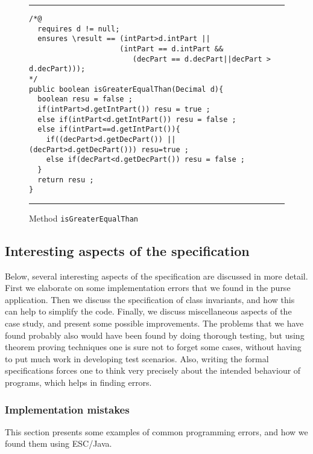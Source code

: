 \documentclass[a4paper]{llncs}
\begin{document}
\begin{figure}[t]
\rule{\linewidth}{0.3mm}
\begin{verbatim}
/*@
  requires d != null;
  ensures \result == (intPart>d.intPart ||
                     (intPart == d.intPart && 
                        (decPart == d.decPart||decPart > d.decPart)));
*/
public boolean isGreaterEqualThan(Decimal d){
  boolean resu = false ;
  if(intPart>d.getIntPart()) resu = true ;
  else if(intPart<d.getIntPart()) resu = false ;
  else if(intPart==d.getIntPart()){
    if((decPart>d.getDecPart()) || (decPart>d.getDecPart())) resu=true ;
    else if(decPart<d.getDecPart()) resu = false ;
  }
  return resu ;
}
\end{verbatim}
\caption{Method {\tt isGreaterEqualThan}}
\label{fig-cla-dec}
\rule{\linewidth}{0.3mm}
\end{figure}


\subsection{Interesting aspects of the specification}\label{SectSpecDetails}
Below, several interesting aspects of the specification are discussed
in more detail. First we elaborate on some implementation errors that
we found in the purse application.  Then we discuss the specification
of class invariants, and how this can help to simplify the
code. Finally, we discuss miscellaneous aspects of the case study, and
present some possible improvements. The problems that we have found
probably also would have been found by doing thorough testing, but
using theorem proving techniques one is sure not to forget some cases,
without having to put much work in developing test scenarios.  Also,
writing the formal specifications forces one to think very precisely
about the intended behaviour of programs, which helps in finding
errors.






\subsubsection{Implementation mistakes}
This section presents some examples of common programming
errors, and how we found them using ESC/Java.
\end{document}
